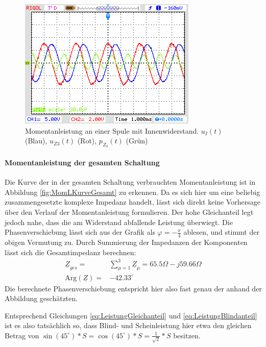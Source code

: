 \begin{figure}[H]
\centering
\includegraphics[width=0.7\linewidth]{Oszi-Bitmaps/NewFile2.jpg}
\caption{Momentanleistung an einer Spule mit Innenwiderstand. $u_I(t)$ (Blau), $u_{Z3}(t)$ (Rot), $p_{Z_3}(t)$ (Grün)}
\label{fig:MomLKurveZ3}
\end{figure}

\paragraph{Momentanleistung der gesamten Schaltung}
Die Kurve der in der gesamten Schaltung verbrauchten Momentanleistung ist in Abbildung \ref{fig:MomLKurveGesamt} zu erkennen. Da es sich hier um eine beliebig zusammengesetzte komplexe Impedanz handelt, lässt sich direkt keine Vorhersage über den Verlauf der Momentanleistung formulieren. Der hohe Gleichanteil legt jedoch nahe, dass die am Widerstand abfallende Leistung überwiegt. Die Phasenverschiebung lässt sich aus der Grafik als $\varphi = -\frac{\pi}{4}$ ablesen, und stimmt der obigen Vermutung zu.
Durch Summierung der Impedanzen der Komponenten lässt sich die Gesamtimpedanz berechnen:
\begin{eqnarray*}
\underline{Z}_{ges} =& \sum_{\mu=1}^3\underline{Z}_\mu = 65.5\Omega - j59.66\Omega\\
\mbox{Arg}(\underline{Z}) =& -42.33^\circ
\end{eqnarray*}
Die berechnete Phasenverschiebung entspricht hier also fast genau der anhand der Abbildung geschätzten.

Entsprechend Gleichungen \eqref{eq:LeistungGleichanteil} und \eqref{eq:LeistungBlindanteil} ist es also tatsächlich so, dass Blind- und Scheinleistung hier etwa den gleichen Betrag von $\sin(45^\circ)*S=\cos(45^\circ)*S = \frac{1}{\sqrt{2}} * S$ besitzen.

